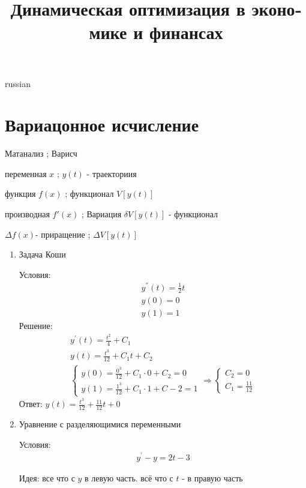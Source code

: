 \documentclass{article}
\begin{document}
\title{\foreignlanguage{russian}{Динамическая оптимизация в экономике и финансах}}
\maketitle

\begin{otherlanguage*}{russian}
\section{\foreignlanguage{russian}{Вариацонное исчисление}}
Матанализ ; Варисч

переменная $x$ ; $y(t)$ - траекториия

функция $f(x)$ ; функционал $V[y(t)]$ 

производная $f'(x)$ ; Вариация $\delta V[y(t)]$ - функционал 

$\Delta f(x) $- приращение ; $ \Delta V[y(t)] $

\begin{enumerate}

\item Задача Коши

Условия:
\begin{align}
y^{''}(t) = \frac{1}{2} t \\
y(0) = 0 \\
y(1) = 1 
\end{align}
Решение:
\begin{align}
y^{'} (t) = \frac{t^2}{4} + C_1 \\
y(t) = \frac{t^3}{12} + C_1 t + C_2 \\
\begin{cases}
y(0) = \frac{0^3}{12} + C_1 \cdot 0 + C_2 = 0 \\
y(1) = \frac{1^3}{12} + C_1 \cdot 1 + C-2 = 1 
\end{cases} \Rightarrow
\begin{cases}
C_2 = 0 \\
C_1 = \frac{11}{12}
\end{cases}
\end{align}
Ответ: $y(t) = \frac{t^3}{12} + \frac{11}{12} t + 0 $

\item Уравнение с разделяющимися переменными

Условия:
\begin{align}
y^{'} - y = 2 t - 3 
\end{align}

Идея: все что с $y$ в левую часть. всё что с $t$ - в правую часть


\end{enumerate}
\end{otherlanguage*}
\end{document}

